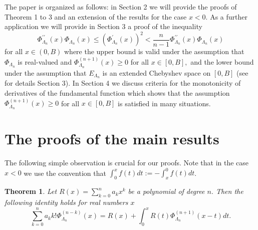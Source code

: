 \documentclass[11pt]{article}%
\newtheorem{theorem}{Theorem}
\begin{document}
The paper is organized as follows: in Section 2 we will provide the proofs of
Theorem 1 to 3 and an extension of the results for the case $x<0.$ As a
further application we will provide in Section 3 a proof of the inequality
\[
\Phi_{\Lambda_{n}}^{\prime\prime}\left(  x\right)  \Phi_{\Lambda_{n}}\left(
x\right)  \leq\left(  \Phi_{\Lambda_{n}}^{\prime}\left(  x\right)  \right)
^{2}<\frac{n}{n-1}\Phi_{\Lambda_{n}}^{\prime\prime}\left(  x\right)
\Phi_{\Lambda_{n}}\left(  x\right)
\]
for all $x\in\left(  0,B\right)  $ where the upper bound is valid under the
assumption that $\Phi_{\Lambda_{n}}$ is real-valued and $\Phi_{\Lambda_{n}%
}^{\left(  n+1\right)  }\left(  x\right)  \geq0$ for all $x\in\left[
0,B\right]  ,$ and the lower bound under the assumption that $E_{\Lambda_{n}}$
is an extended Chebyshev space on $\left[  0,B\right]  $ (see for details
Section 3). In Section 4 we discuss criteria for the monotonicity of
derivatives of the fundamental function which shows that the assumption
$\Phi_{\Lambda_{n}}^{\left(  n+1\right)  }\left(  x\right)  \geq0$ for all
$x\in\left[  0,B\right]  $ is satisfied in many situations.

\section{The proofs of the main results}

The following simple observation is crucial for our proofs. Note that in the
case $x<0$ we use the convention that $\int_{0}^{x}f\left(  t\right)
dt:=-\int_{x}^{0}f\left(  t\right)  dt$.

\begin{theorem}
\label{ThmMain0}Let $R\left(  x\right)  =%
{\displaystyle\sum_{k=0}^{n}}
a_{k}x^{k}$ be a polynomial of degree $n.$ Then the following identity holds
for real numbers $x$
\[%
{\displaystyle\sum_{k=0}^{n}}
a_{k}k!\Phi_{\Lambda_{n}}^{\left(  n-k\right)  }\left(  x\right)  =R\left(
x\right)  +\int_{0}^{x}R\left(  t\right)  \Phi_{\Lambda_{n}}^{\left(
n+1\right)  }\left(  x-t\right)  dt.
\]

\end{theorem}
\end{document}
